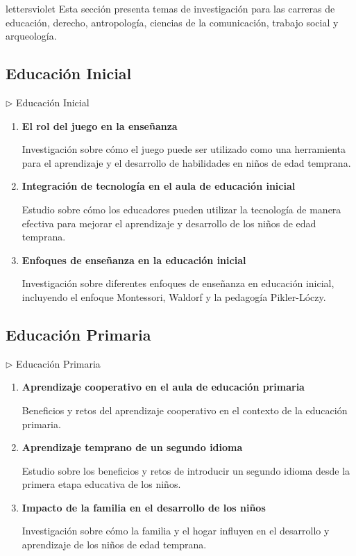 \documentclass[12pt,a4paper]{article}
\begin{document}
\begin{facultybox}{lettersviolet}{}
Esta sección presenta temas de investigación para las carreras de educación, derecho, antropología, ciencias de la comunicación, trabajo social y arqueología.
\end{facultybox}

\subsection{Educación Inicial}

\begin{careerbox}{$\triangleright$ Educación Inicial}
		\begin{enumerate}
		\item \textbf{El rol del juego en la enseñanza}
		
		Investigación sobre cómo el juego puede ser utilizado como una herramienta para el aprendizaje y el desarrollo de habilidades en niños de edad temprana.
		
		\item \textbf{Integración de tecnología en el aula de educación inicial}
		
		Estudio sobre cómo los educadores pueden utilizar la tecnología de manera efectiva para mejorar el aprendizaje y desarrollo de los niños de edad temprana.
		
		\item \textbf{Enfoques de enseñanza en la educación inicial}
		
		Investigación sobre diferentes enfoques de enseñanza en educación inicial, incluyendo el enfoque Montessori, Waldorf y la pedagogía Pikler-Lóczy.
	\end{enumerate}
\end{careerbox}

\subsection{Educación Primaria}

\begin{careerbox}{$\triangleright$ Educación Primaria}
	\begin{enumerate}
		\item \textbf{Aprendizaje cooperativo en el aula de educación primaria}
		
		Beneficios y retos del aprendizaje cooperativo en el contexto de la educación primaria.
		
		\item \textbf{Aprendizaje temprano de un segundo idioma}
		
		Estudio sobre los beneficios y retos de introducir un segundo idioma desde la primera etapa educativa de los niños.
		
		\item \textbf{Impacto de la familia en el desarrollo de los niños}
		
		Investigación sobre cómo la familia y el hogar influyen en el desarrollo y aprendizaje de los niños de edad temprana.
	\end{enumerate}
\end{careerbox}
\end{document}
